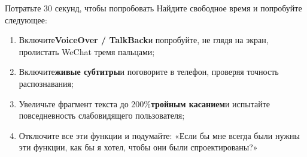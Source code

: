 \begin{tcbpractice}{Потратьте 30 секунд, чтобы попробовать}
Найдите свободное время и попробуйте следующее:

\begin{enumerate}
  \item Включите\textbf{VoiceOver / TalkBack}и попробуйте, не глядя на экран, пролистать WeChat тремя пальцами;
  \item Включите\textbf{живые субтитры}и поговорите в телефон, проверяя точность распознавания;
  \item Увеличьте фрагмент текста до 200\%\textbf{тройным касанием}и испытайте повседневность слабовидящего пользователя;
  \item Отключите все эти функции и подумайте: «Если бы мне всегда были нужны эти функции, как бы я хотел, чтобы они были спроектированы?»
\end{enumerate}

\end{tcbpractice}

